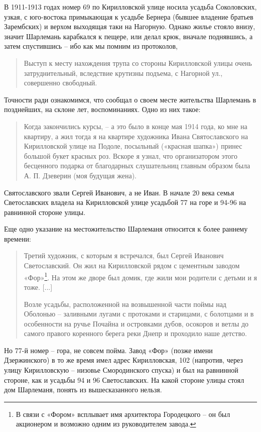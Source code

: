 В 1911-1913 годах номер 69 по Кирилловской улице носила усадьба Соколовских, узкая, с юго-востока примыкающая к усадьбе Бернера (бывшее владение братьев Зарембских) и верхом выходящая таки на Нагорную. Однако жилье стояло внизу, значит Шарлемань карабкался к пещере, или делал крюк, вначале поднявшись, а затем спустившись – ибо как мы помним из протоколов,

\begin{quotation}
Выступ к месту нахождения трупа со стороны Кирилловской улицы очень затруднительный, вследствие крутизны подъема, с Нагорной ул., совершенно свободный.
\end{quotation}

Точности ради ознакомимся, что сообщал о своем месте жительства Шарлемань в позднейших, на склоне лет, воспоминаниях. Одно из них такое:

\begin{quotation}
Когда закончились курсы, – а это было в конце мая 1914 года, ко мне на квартиру, а жил тогда я на квартире художника Ивана Святославского на Кирилловской улице на Подоле, посыльный («красная шапка») принес большой букет красных роз. Вскоре я узнал, что организатором этого бесценного подарка от благодарных слушательниц главным образом была А. П. Дзеверин (моя будущая жена).
\end{quotation}

Святославского звали Сергей Иванович, а не Иван. В начале 20 века семья Светославских владела на Кирилловской улице усадьбой 77 на горе и 94-96 на равнинной стороне улицы. 

Еще одно указание на местожительство Шарлеманя относится к более раннему времени:

\begin{quotation}
Третий художник, с которым я встречался, был Сергей Иванович Светославский. Он жил на Кирилловской рядом с цементным заводом «Фор»\footnote{В связи с «Фором» всплывает имя архитектора Городецкого – он был акционером и возможно одним из руководителем завода.}. На этом же дворе был домик, где жили мои родители с детьми и я тоже. [...]

Возле усадьбы, расположенной на возвышенной части поймы над Оболонью – заливными лугами с протоками и старицами, с болотцами и в особенности на ручье Почайна и островками дубов, осокоров и ветлы до самого правого коренного берега реки Днепр и проходило наше детство. \end{quotation}

Но 77-й номер – гора, не совсем пойма. Завод «Фор» (позже имени Дзержинского) в то же время имел адрес Кирилловская, 102 (напротив, через улицу Кирилловскую – низовье Смородинского спуска) и был на равнинной стороне, как и усадьбы 94 и 96 Светославских. На какой стороне улицы стоял дом Шарлеманя, понять из вышесказанного нельзя.

